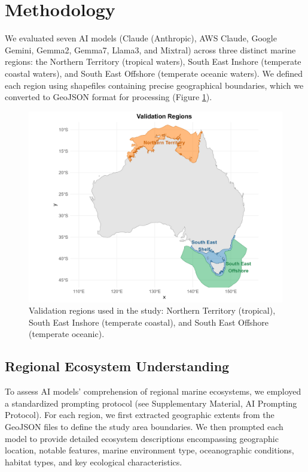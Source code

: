 \section{Methodology}

We evaluated seven AI models (Claude (Anthropic), AWS Claude, Google Gemini, Gemma2, Gemma7, Llama3, and Mixtral) across three distinct marine regions: the Northern Territory (tropical waters), South East Inshore (temperate coastal waters), and South East Offshore (temperate oceanic waters). We defined each region using shapefiles containing precise geographical boundaries, which we converted to GeoJSON format for processing (Figure \ref{fig:validation_regions}).

\begin{figure}[H]
    \centering
    \includegraphics[width=\textwidth]{validation_regions.png}
    \caption{Validation regions used in the study: Northern Territory (tropical), South East Inshore (temperate coastal), and South East Offshore (temperate oceanic).}
    \label{fig:validation_regions}
\end{figure}

\subsection{Regional Ecosystem Understanding}
To assess AI models' comprehension of regional marine ecosystems, we employed a standardized prompting protocol (see Supplementary Material, AI Prompting Protocol). For each region, we first extracted geographic extents from the GeoJSON files to define the study area boundaries. We then prompted each model to provide detailed ecosystem descriptions encompassing geographic location, notable features, marine environment type, oceanographic conditions, habitat types, and key ecological characteristics.

